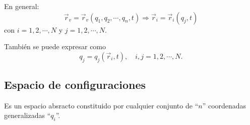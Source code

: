 \documentclass[../main]{subfiles}
\begin{document}
En general:
\begin{equation}
    \vec{r}_v=\vec{r}_v(q_1, q_2, \cdots, q_n, t) \Rightarrow \vec{r}_i=\vec{r}_i(q_j, t)
\end{equation}
con $i=1,2, \cdots, N$ y $j=1,2, \cdots, N$.

También se puede expresar como
\begin{equation*}
    q_j=q_j(\vec{r}_i, t), \quad i,j=1,2,\cdots,N.
\end{equation*}

\subsection{Espacio de configuraciones}

Es un espacio absracto constituido por cualquier conjunto de ``$n$'' coordenadas generalizadas ``$q_i$''.
\end{document}
